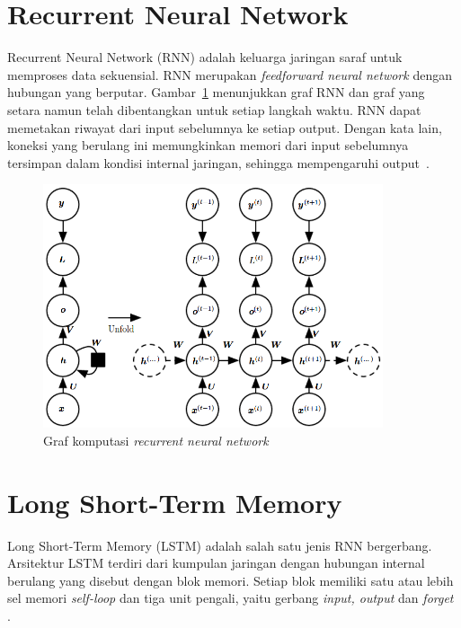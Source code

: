 %
\section{Recurrent Neural Network}
Recurrent Neural Network (RNN) adalah keluarga jaringan saraf untuk memproses data sekuensial. RNN merupakan \textit{feedforward neural network} dengan hubungan yang berputar. Gambar~\ref{gambar:rnn} menunjukkan graf RNN dan graf yang setara namun telah dibentangkan untuk setiap langkah waktu. RNN dapat memetakan riwayat dari input sebelumnya ke setiap output. Dengan kata lain, koneksi yang berulang ini memungkinkan memori dari input sebelumnya tersimpan dalam kondisi internal jaringan, sehingga mempengaruhi output~\Parencite{graves-2012}.

\begin{figure}
    \centering
    \includegraphics[width=10cm]{gambar/landasan-teori/rnn.png}
    \caption{Graf komputasi \textit{recurrent neural network} \Parencite{Goodfellow-2016}}
    \label{gambar:rnn}
\end{figure}


\section{Long Short-Term Memory}
Long Short-Term Memory (LSTM) adalah salah satu jenis RNN bergerbang. Arsitektur LSTM terdiri dari kumpulan jaringan dengan hubungan internal berulang yang disebut dengan blok memori. Setiap blok memiliki satu atau lebih sel memori \textit{self-loop} dan tiga unit pengali, yaitu gerbang \textit{input, output} dan \textit{forget} \Parencite{graves-2012}.

